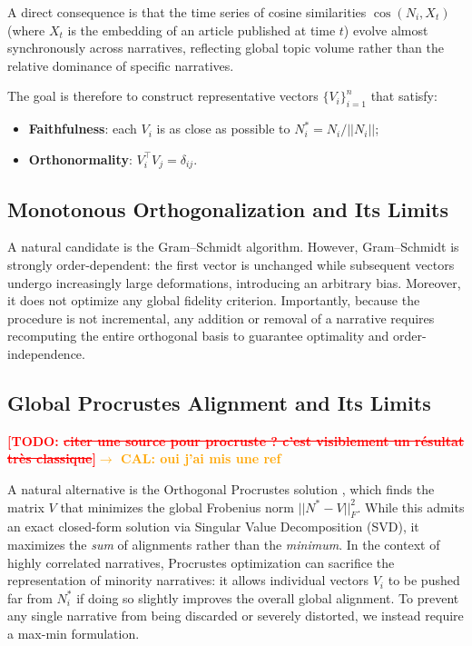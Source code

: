 \documentclass[
  journal=medium,
  manuscript=article-type,
  year=2025,
  volume=1,
]{cup-journal}
\newcommand{\TODO}[1]{\textcolor{red}{\textbf{[TODO: #1]}}}
\begin{document}
A direct consequence is that the time series of cosine similarities
$\cos(N_i, X_t)$ (where $X_t$ is the embedding of an article published at time $t$)
evolve almost synchronously across narratives, reflecting global topic volume
rather than the relative dominance of specific narratives.

The goal is therefore to construct representative vectors $\{V_i\}_{i=1}^{n}$
that satisfy:
\begin{itemize}
    \item \textbf{Faithfulness}: each $V_i$ is as close as possible to $N_i^* = N_i / ||N_i||$;
    \item \textbf{Orthonormality}: $V_i^\top V_j = \delta_{ij}$.
\end{itemize}

\subsection{Monotonous Orthogonalization and Its Limits}
\label{sec:ortho:gram}


A natural candidate is the Gram--Schmidt algorithm.
However, Gram--Schmidt is strongly order-dependent: the first vector is unchanged
while subsequent vectors undergo increasingly large deformations, introducing an
arbitrary bias.
Moreover, it does not optimize any global fidelity criterion.
Importantly, because the procedure is not incremental, any addition or removal of a
narrative requires recomputing the entire orthogonal basis to guarantee
optimality and order-independence. 


\subsection{Global Procrustes Alignment and Its Limits}
\label{sec:ortho:procrustes}

\TODO{\st{citer une source pour procruste ? c'est visiblement un résultat très classique}}\textcolor{Orange}{\bf $\to$ CAL: oui j'ai mis une ref}

A natural alternative is the Orthogonal Procrustes solution \textcolor{ForestGreen}{\autocite{schonemann1966generalized}}, which finds the matrix $V$ that minimizes the global Frobenius norm $||N^* - V||_F^2$. While this admits an exact closed-form solution via Singular Value Decomposition (SVD), it maximizes the \emph{sum} of alignments rather than the \emph{minimum}. In the context of highly correlated narratives, Procrustes optimization can sacrifice the representation of minority narratives: it allows individual vectors $V_i$ to be pushed far from $N_i^*$ if doing so slightly improves the overall global alignment. To prevent any single narrative from being discarded or severely distorted, we instead require a max-min formulation.
\end{document}
